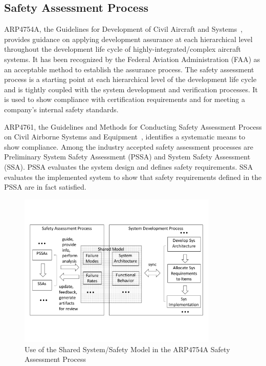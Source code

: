 \subsection{Safety Assessment Process}
\label{subsec:process}

ARP4754A, the Guidelines for Development of Civil Aircraft and Systems~\cite{SAE:ARP4754A}, provides guidance on applying development assurance at each hierarchical level throughout the development life cycle of highly-integrated/complex aircraft systems. It has been recognized by the Federal Aviation Administration (FAA) as an acceptable method to establish the assurance process. The safety assessment process is a starting point at each hierarchical level of the development life cycle and is tightly coupled with the system development and verification processes. It is used to show compliance with certification requirements and for meeting a company's internal safety standards. 

ARP4761, the Guidelines and Methods for Conducting Safety Assessment Process on Civil Airborne Systems and Equipment~\cite{SAE:ARP4761},  identifies a systematic means to show compliance. Among the industry accepted safety assessment processes are Preliminary System Safety Assessment (PSSA) and System Safety Assessment (SSA). PSSA evaluates the system design and defines safety requirements. SSA evaluates the implemented system to show that safety requirements defined in the PSSA are in fact satisfied.

\begin{figure}[t!]
	\vspace{-0.45in}
	\centering
	\includegraphics[trim=0 9 0 5,clip,width=0.85\textwidth]{images/safety_process.pdf}
	\vspace{-0.45in}
	\caption{Use of the Shared System/Safety Model in the ARP4754A Safety Assessment Process}
	\label{fig:proposed_safety_process}
\end{figure}


